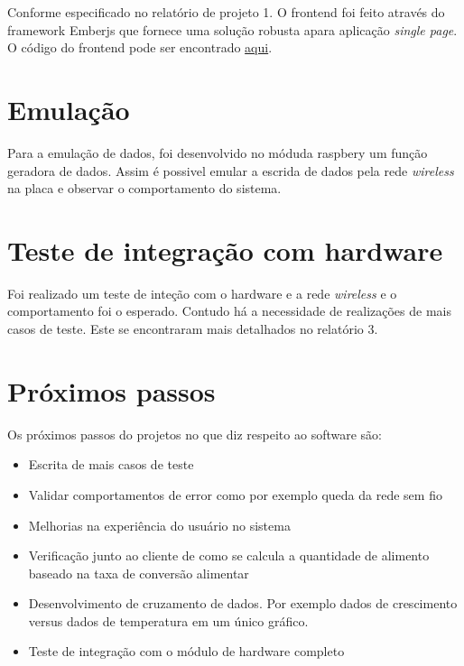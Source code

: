 Conforme especificado no relatório de projeto 1. O frontend foi feito através do framework Emberjs que fornece uma solução robusta apara aplicação \textit{single page}. O código do frontend pode ser encontrado \href{https://github.com/PI2-Crema/front-ember}{aqui}.

\section{Emulação}

Para a emulação de dados, foi desenvolvido no móduda raspbery um função geradora de dados. Assim é possivel emular a escrida de dados pela rede \textit{wireless} na placa e observar o comportamento do sistema.

\section{Teste de integração com hardware}

Foi realizado um teste de inteção com o hardware e a rede \textit{wireless} e o comportamento foi o esperado. Contudo há a necessidade de realizações de mais casos de teste. Este se encontraram mais detalhados no relatório 3.

\section{Próximos passos}

Os próximos passos do projetos no que diz respeito ao software são:

\begin{itemize}
    \item Escrita de mais casos de teste
    \item Validar comportamentos de error como por exemplo queda da rede sem fio
    \item Melhorias na experiência do usuário no sistema
    \item Verificação junto ao cliente de como se calcula a quantidade de alimento baseado na taxa de conversão alimentar
    \item Desenvolvimento de cruzamento de dados. Por exemplo dados de crescimento versus dados de temperatura em um único gráfico.
    \item Teste de integração com o módulo de hardware completo
\end{itemize}
